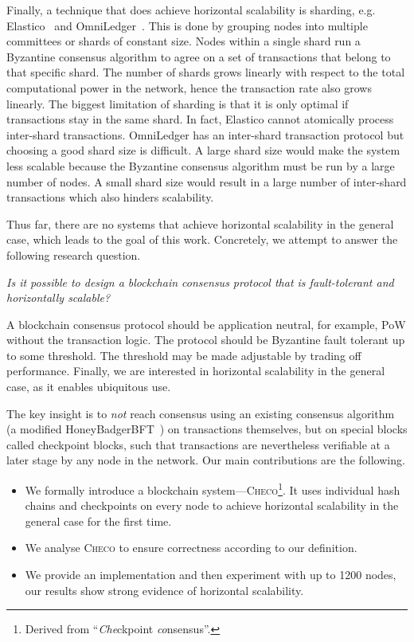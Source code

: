 Finally, a technique that does achieve horizontal scalability is sharding, e.g. Elastico~\cite{luu2016elastico} and OmniLedger~\cite{kokoris2017omniledger}.
This is done by grouping nodes into multiple committees or shards of constant size.
Nodes within a single shard run a Byzantine consensus algorithm to agree on a set of transactions that belong to that specific shard.
The number of shards grows linearly with respect to the total computational power in the network, hence the transaction rate also grows linearly.
The biggest limitation of sharding is that it is only optimal if transactions stay in the same shard.
In fact, Elastico cannot atomically process inter-shard transactions.
OmniLedger has an inter-shard transaction protocol but choosing a good shard size is difficult.
A large shard size would make the system less scalable because the Byzantine consensus algorithm must be run by a large number of nodes.
A small shard size would result in a large number of inter-shard transactions which also hinders scalability.

Thus far, there are no systems that achieve horizontal scalability in the general case,
which leads to the goal of this work.
Concretely, we attempt to answer the following research question.
\begin{displayquote}
\emph{Is it possible to design a blockchain consensus protocol that is fault-tolerant and horizontally scalable?}
\end{displayquote}
A blockchain consensus protocol should be application neutral,
for example, PoW without the transaction logic.
The protocol should be Byzantine fault tolerant up to some threshold.
The threshold may be made adjustable by trading off performance.
Finally, we are interested in horizontal scalability in the general case, as it enables ubiquitous use.

The key insight is to \emph{not} reach consensus using an existing consensus algorithm (a modified HoneyBadgerBFT~\cite{miller2016honey}) on transactions themselves,
but on special blocks called checkpoint blocks,
such that transactions are nevertheless verifiable at a later stage by any node in the network.
Our main contributions are the following.
\begin{itemize}
    \item We formally introduce a blockchain system---\textsc{Checo}\footnote{Derived from ``\emph{Che}ckpoint \emph{co}nsensus''.}.
        It uses individual hash chains and checkpoints on every node to achieve
        horizontal scalability in the general case for the first time.
    \item We analyse \textsc{Checo} to ensure correctness according to our definition.
    \item We provide an implementation and then experiment with up to 1200 nodes,
        our results show strong evidence of horizontal scalability.
\end{itemize}

